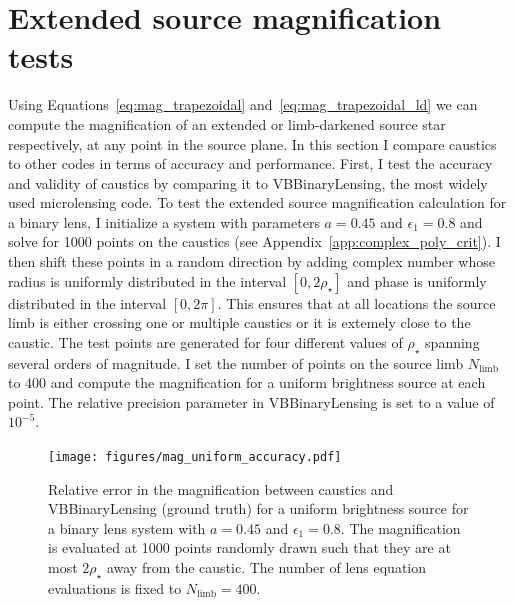 \documentclass[12pt,dvipsnames]{report}
\newcommand{\ssf}[1]{\textsf{#1}}
\begin{document}
\section{Extended source magnification tests}
Using Equations~\ref{eq:mag_trapezoidal} and~\ref{eq:mag_trapezoidal_ld} we can compute the 
magnification of an extended or limb-darkened source star respectively, at any point in the 
source plane. In this section I compare \ssf{caustics} to other codes in terms of accuracy
and performance. First, I test the accuracy and validity of \ssf{caustics} by comparing it 
to \ssf{VBBinaryLensing}, the most widely used microlensing code. To test the extended 
source magnification calculation for a binary lens,  I initialize a system with parameters 
$a=0.45$ and $\epsilon_1=0.8$ and solve for 1000 points on the caustics (see 
Appendix~\ref{app:complex_poly_crit}). I then shift these points in a random direction by 
adding complex number whose radius is uniformly distributed in the interval $[0, 2\rho_\star]$ 
and phase is uniformly distributed in the interval $[0, 2\pi]$. This ensures that at all 
locations the source limb is either crossing one or multiple caustics or it is extemely 
close to the caustic. 
The test points are generated for four different values of $\rho_\star$ spanning several 
orders of magnitude. I set the number of points on the source limb  $N_\mathrm{limb}$ to 
$400$ and compute the magnification for a uniform brightness source at each point. The 
relative precision parameter in \ssf{VBBinaryLensing} is set to a value of $10^{-5}$. 

\begin{figure}[t]
    \begin{centering}
        \texttt{[image: figures/mag\_uniform\_accuracy.pdf]}
        \caption{Relative error in the magnification between \ssf{caustics} and 
        \ssf{VBBinaryLensing} (ground truth) for a uniform brightness source for a binary 
        lens system with $a=0.45$ and $\epsilon_1=0.8$. The magnification is evaluated at 
        1000 points randomly drawn such that they are at most $2\rho_\star$ away from the
        caustic. The number of lens equation evaluations is fixed to $N_\mathrm{limb}=400$.}
            \label{fig:mag_uniform_accuracy}
    \end{centering}
\end{figure}
\end{document}
